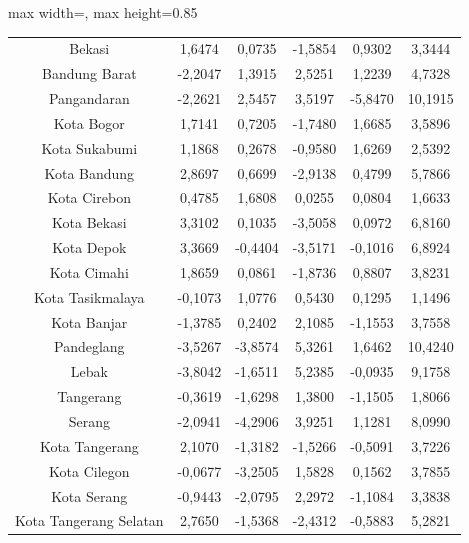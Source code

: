 \begin{table}[H]
\begin{adjustbox}{max width=\textwidth, max height=0.85\textheight}
\begin{tabular}{|c|c|c|c|c|c|}
Bekasi & 1,6474 & 0,0735 & -1,5854 & 0,9302 & 3,3444 \\
Bandung Barat & -2,2047 & 1,3915 & 2,5251 & 1,2239 & 4,7328 \\
Pangandaran & -2,2621 & 2,5457 & 3,5197 & -5,8470 & 10,1915 \\
Kota Bogor & 1,7141 & 0,7205 & -1,7480 & 1,6685 & 3,5896 \\
Kota Sukabumi & 1,1868 & 0,2678 & -0,9580 & 1,6269 & 2,5392 \\
Kota Bandung & 2,8697 & 0,6699 & -2,9138 & 0,4799 & 5,7866 \\
Kota Cirebon & 0,4785 & 1,6808 & 0,0255 & 0,0804 & 1,6633 \\
Kota Bekasi & 3,3102 & 0,1035 & -3,5058 & 0,0972 & 6,8160 \\
Kota Depok & 3,3669 & -0,4404 & -3,5171 & -0,1016 & 6,8924 \\
Kota Cimahi & 1,8659 & 0,0861 & -1,8736 & 0,8807 & 3,8231 \\
Kota Tasikmalaya & -0,1073 & 1,0776 & 0,5430 & 0,1295 & 1,1496 \\
Kota Banjar & -1,3785 & 0,2402 & 2,1085 & -1,1553 & 3,7558 \\
Pandeglang & -3,5267 & -3,8574 & 5,3261 & 1,6462 & 10,4240 \\
Lebak & -3,8042 & -1,6511 & 5,2385 & -0,0935 & 9,1758 \\
Tangerang & -0,3619 & -1,6298 & 1,3800 & -1,1505 & 1,8066 \\
Serang & -2,0941 & -4,2906 & 3,9251 & 1,1281 & 8,0990 \\
Kota Tangerang & 2,1070 & -1,3182 & -1,5266 & -0,5091 & 3,7226 \\
Kota Cilegon & -0,0677 & -3,2505 & 1,5828 & 0,1562 & 3,7855 \\
Kota Serang & -0,9443 & -2,0795 & 2,2972 & -1,1084 & 3,3838 \\
Kota Tangerang Selatan & 2,7650 & -1,5368 & -2,4312 & -0,5883 & 5,2821 \\
\hline
\end{tabular}
\end{adjustbox}
\end{table}